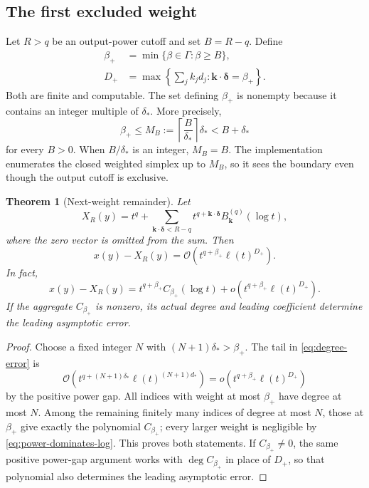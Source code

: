 \documentclass[11pt,a4paper]{article}
\numberwithin{equation}{section}
\newtheorem{theorem}{Theorem}[section]
\theoremstyle{definition}
\newcommand{\OO}{\mathcal O}
\newcommand{\kk}{\boldsymbol k}
\newcommand{\deltaa}{\boldsymbol\delta}
\newcommand{\degree}{\operatorname{deg}}
\begin{document}
\subsection{The first excluded weight}
Let $R>q$ be an output-power cutoff and set $B=R-q$.
Define
\begin{align}
 \beta_+&=\min\{\beta\in\Gamma:\beta\ge B\},\label{eq:frontier}\\
 D_+&=\max\left\{\sum_jk_jd_j:\kk\cdot\deltaa=\beta_+\right\}.
 \label{eq:frontier-degree}
\end{align}
Both are finite and computable. The set defining $\beta_+$ is nonempty
because it contains an integer multiple of $\delta_*$. More precisely,
\begin{equation}\label{eq:frontier-search}
 \beta_+\le M_B:=\left\lceil\frac B{\delta_*}\right\rceil\delta_*
 <B+\delta_*
\end{equation}
for every $B>0$. When $B/\delta_*$ is an integer, $M_B=B$.
The implementation enumerates the closed weighted simplex up to $M_B$,
so it sees the boundary even though the output cutoff is exclusive.

\begin{theorem}[Next-weight remainder]\label{thm:remainder}
Let
\begin{equation}\label{eq:truncated}
 X_R(y)=t^q+\sum_{\kk\cdot\deltaa<R-q}
            t^{q+\kk\cdot\deltaa}B_{\kk}^{(q)}(\log t),
\end{equation}
where the zero vector is omitted from the sum. Then
\begin{equation}\label{eq:sharp-order}
 x(y)-X_R(y)=\OO\!\left(t^{q+\beta_+}\ell(t)^{D_+}\right).
\end{equation}
In fact,
\begin{equation}\label{eq:first-omitted}
 x(y)-X_R(y)=t^{q+\beta_+}C_{\beta_+}(\log t)
             +o\!\left(t^{q+\beta_+}\ell(t)^{D_+}\right).
\end{equation}
If the aggregate $C_{\beta_+}$ is nonzero, its actual degree and leading
coefficient determine the leading asymptotic error.
\end{theorem}
\begin{proof}
Choose a fixed integer $N$ with $(N+1)\delta_*>\beta_+$.
The tail in \eqref{eq:degree-error} is
\[
 \OO\!\left(t^{q+(N+1)\delta_*}\ell(t)^{(N+1)d_*}\right)
 =o\!\left(t^{q+\beta_+}\ell(t)^{D_+}\right)
\]
by the positive power gap. All indices with weight at most $\beta_+$
have degree at most $N$. Among the remaining finitely many indices of
degree at most $N$, those at $\beta_+$ give exactly the polynomial
$C_{\beta_+}$; every larger weight is negligible by
\eqref{eq:power-dominates-log}. This proves both statements. If $C_{\beta_+}\ne0$, the same positive
power-gap argument works with $\degree C_{\beta_+}$ in place of $D_+$,
so that polynomial also determines the leading asymptotic error.
\end{proof}
\end{document}
